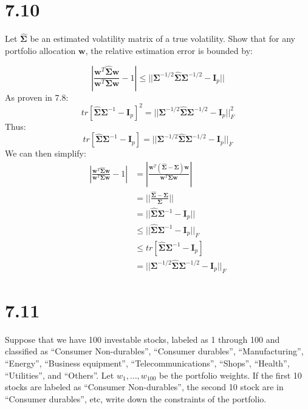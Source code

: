 \documentclass[11pt,]{article}
\begin{document}
\hypertarget{section-1}{%
\section{7.10}\label{section-1}}

Let \(\hat{{\bm{{\Sigma}}}}\) be an estimated volatility matrix of a
true volatility. Show that for any portfolio allocation \({\bm{{w}}}\),
the relative estimation error is bounded by:

\[
|\frac{{\bm{{w}}}^T \hat{{\bm{{\Sigma}}}} {\bm{{w}}} }{ {\bm{{w}}}^T {\bm{{\Sigma}}} {\bm{{w}}}}-1| \leq || {\bm{{\Sigma}}} ^{-1/2} \hat{{\bm{{\Sigma}}}} {\bm{{\Sigma}}}^{-1/2} - {\bm{{I}}}_p||
\] As proven in 7.8: \[
tr[\hat{{\bm{{\Sigma}}}} {\bm{{\Sigma}}}^{-1} - {\bm{{I}}}_p]^2 = || {\bm{{\Sigma}}}^{-1/2} \hat{{\bm{{\Sigma}}}} {\bm{{\Sigma}}}^{-1/2} - {\bm{{I}}}_p||_F^2
\] Thus: \[
tr[\hat{{\bm{{\Sigma}}}} {\bm{{\Sigma}}}^{-1} - {\bm{{I}}}_p] = || {\bm{{\Sigma}}}^{-1/2} \hat{{\bm{{\Sigma}}}} {\bm{{\Sigma}}}^{-1/2} - {\bm{{I}}}_p||_F
\] We can then simplify: \[
\begin{aligned}
|\frac{{\bm{{w}}}^T \hat{{\bm{{\Sigma}}}} {\bm{{w}}} }{ {\bm{{w}}}^T {\bm{{\Sigma}}} {\bm{{w}}}}-1| &=
|\frac{{\bm{{w}}}^T(\hat{{\bm{{\Sigma}}}} - {\bm{{\Sigma}}}) {\bm{{w}}}}{ {\bm{{w}}}^T {\bm{{\Sigma}}} {\bm{{w}}} } |\\
&= || \frac{\hat{{\bm{{\Sigma}}}} - {\bm{{\Sigma}}} }{{\bm{{\Sigma}}}}|| \\
&= ||\hat{{\bm{{\Sigma}}}} {\bm{{\Sigma}}}^{-1} - {\bm{{I}}}_p || \\
&\leq ||\hat{{\bm{{\Sigma}}}} {\bm{{\Sigma}}}^{-1} - {\bm{{I}}}_p ||_F \\
&\leq tr[\hat{{\bm{{\Sigma}}}} {\bm{{\Sigma}}}^{-1} - {\bm{{I}}}_p] \\
&= || {\bm{{\Sigma}}}^{-1/2} \hat{{\bm{{\Sigma}}}} {\bm{{\Sigma}}}^{-1/2} - {\bm{{I}}}_p||_F
\end{aligned}
\]

\hypertarget{section-2}{%
\section{7.11}\label{section-2}}

Suppose that we have 100 investable stocks, labeled as 1 through 100 and
classified as ``Consumer Non-durables'', ``Consumer durables'',
``Manufacturing'', ``Energy'', ``Business equipment'',
``Telecommunications'', ``Shops'', ``Health'', ``Utilities'', and
``Others''. Let \(w_1, \ldots, w_{100}\) be the portfolio weights. If
the first 10 stocks are labeled as ``Consumer Non-durables'', the second
10 stock are in ``Consumer durables'', etc, write down the constraints
of the portfolio.
\end{document}
